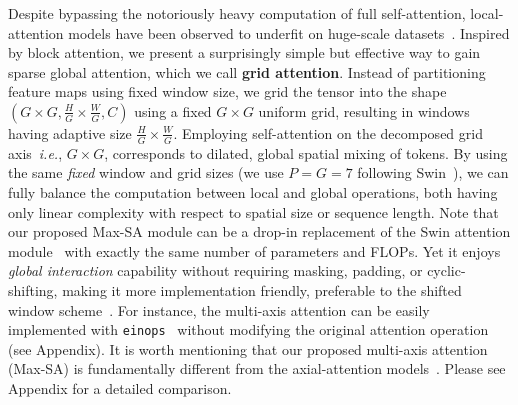 \documentclass[runningheads]{llncs}
\begin{document}
Despite bypassing the notoriously heavy computation of full self-attention, local-attention models have been observed to underfit on huge-scale datasets~\cite{dai2021coatnet,dosovitskiy2020image}.
Inspired by block attention, we present a surprisingly simple but effective way to gain sparse global attention, which we call \textbf{grid attention}.
Instead of partitioning feature maps using fixed window size, we {grid} the tensor into the shape $(G\times G,\frac{H}{G}\times\frac{W}{G},C)$ using a fixed $G\times G$ uniform grid, resulting in windows having adaptive size $\frac{H}{G}\times\frac{W}{G}$.
Employing self-attention on the decomposed grid axis~\emph{i.e.}, $G\times G$, corresponds to dilated, global spatial mixing of tokens.
By using the same \textit{fixed} window and grid sizes (we use $P=G=7$ following Swin~\cite{liu2021swin}), we can fully balance the computation between local and global operations, both having only linear complexity with respect to spatial size or sequence length.
Note that our proposed Max-SA module can be a drop-in replacement of the Swin attention module~\cite{liu2021swin} with exactly the same number of parameters and FLOPs. Yet it enjoys \textit{global interaction} capability without requiring masking, padding, or cyclic-shifting, making it more implementation friendly, preferable to the shifted window scheme~\cite{liu2021swin}.
For instance, the multi-axis attention can be easily implemented with \texttt{einops}~\cite{rogozhnikov2022einops} without modifying the original attention operation (see Appendix).
It is worth mentioning that our proposed multi-axis attention (Max-SA) is fundamentally different from the axial-attention models~\cite{wang2020axial,ho2019axial}.
Please see Appendix for a detailed comparison.
\end{document}
